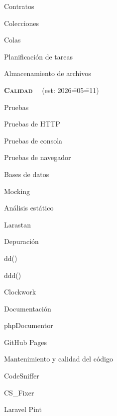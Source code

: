 \begin{longenum}
\begin{longenum}
        \item Contratos
        \item Colecciones
        \item Colas
        \item Planificación de tareas
        \item Almacenamiento de archivos
    \end{longenum}
    \item \textbf{\textsc{Calidad}} \ \opcional\ (est: 2026\==05\==11)
    \begin{longenum}
        \item Pruebas
        \begin{longenum}
            \item Pruebas de HTTP
            \item Pruebas de consola
            \item Pruebas de navegador
            \item Bases de datos
            \item Mocking
        \end{longenum}
        \item Análisis estático
        \begin{longenum}
            \item Larastan
        \end{longenum}
        \item Depuración
        \begin{longenum}
            \item dd()
            \item ddd()
            \item Clockwork
        \end{longenum}
        \item Documentación \opcional\
        \begin{longenum}
            \item phpDocumentor
            \item GitHub Pages
        \end{longenum}
        \item Mantenimiento y calidad del código
        \begin{longenum}
            \item CodeSniffer
            \item CS\_Fixer
            \begin{longenum}
                \item Laravel Pint
            \end{longenum}
        \end{longenum}
    \end{longenum}
\end{longenum}
